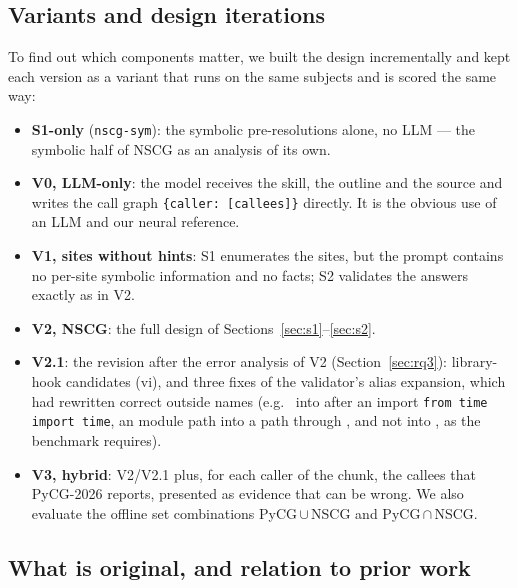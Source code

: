 \subsection{Variants and design iterations}
\label{sec:variants}

To find out which components matter, we built the design incrementally and
kept each version as a variant that runs on the same subjects and is scored the same way:

\begin{itemize}[leftmargin=*]
\item \textbf{S1-only} (\texttt{nscg-sym}): the symbolic pre-resolutions alone,
no LLM --- the symbolic half of NSCG as an analysis of its own.
\item \textbf{V0, LLM-only}: the model receives the skill, the outline and the
source and writes the call graph \texttt{\{caller: [callees]\}} directly. It is
the obvious use of an LLM and our neural reference.
\item \textbf{V1, sites without hints}: S1 enumerates the sites, but the prompt
contains no per-site symbolic information and no facts; S2 validates the answers exactly as in V2.
\item \textbf{V2, NSCG}: the full design of Sections~\ref{sec:s1}--\ref{sec:s2}.
\item \textbf{V2.1}: the revision after the error analysis of V2
(Section~\ref{sec:rq3}): library-hook candidates (vi), and three fixes of the
validator's alias expansion, which had rewritten correct outside names (e.g.\
 into  after an import \texttt{from time
import time}, an \code{invoke} module path into a path through
, and  not into
, as the benchmark requires).
\item \textbf{V3, hybrid}: V2/V2.1 plus, for each caller of the chunk, the
callees that PyCG-2026 reports, presented as evidence that can be wrong.
We also evaluate the offline set combinations PyCG\,$\cup$\,NSCG and
PyCG\,$\cap$\,NSCG.
\end{itemize}

\subsection{What is original, and relation to prior work}

